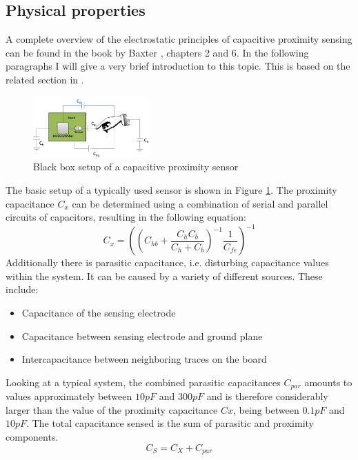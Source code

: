 \subsection{Physical properties}
A complete overview of the electrostatic principles of capacitive proximity sensing can be found in the book by Baxter \cite{Baxter1996}, chapters 2 and 6. In the following paragraphs I will give a very brief introduction to this topic. This is based on the related section in \cite{braun2014capjaise}.
\begin{figure}[h]
\centering
\includegraphics[width=0.4\textwidth]{images/cap_blackbox.png}
\caption{Black box setup of a capacitive proximity sensor}
\label{fig:cap_blackbox}
\end{figure}
The basic setup of a typically used sensor is shown in Figure \ref{fig:cap_blackbox}. The proximity capacitance \(C_{x}\) can be determined using a combination of serial and parallel circuits of capacitors, resulting in the following equation:
\begin{equation}
C_{x}=\left(\left(C_{hb}+\frac{C_{h}C_{b}}{C_{h}+C_{b}}\right)^{-1}\frac{1}{C_{fe}}\right)^{-1}
\end{equation}
Additionally there is parasitic capacitance, i.e. disturbing capacitance values within the system. It can be caused by a variety of different sources. These include:
\begin{itemize}
\item Capacitance of the sensing electrode 
\item Capacitance between sensing electrode and ground plane
\item Intercapacitance between neighboring traces on the board
\end{itemize}
Looking at a typical system, the combined parasitic capacitances \(C_{par}\) amounts to values approximately between \(10pF\) and \(300pF\) and is therefore considerably larger than the value of the proximity capacitance \(Cx\), being between \(0.1pF\) and \(10pF\). The total capacitance sensed is the sum of parasitic and proximity components. 
\begin{equation}
C_{S}=C_{X}+C_{par}
\end{equation}

